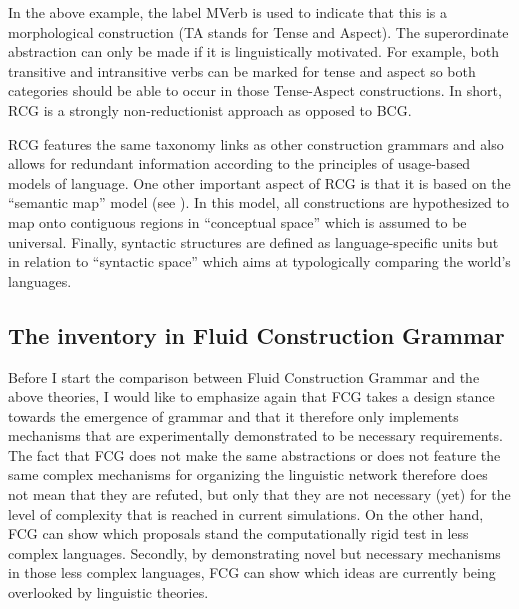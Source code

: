 \ea
{}
\z

In the above example, the label MVerb is used to indicate that this is a morphological construction (TA stands for Tense and Aspect). The superordinate abstraction can only be made if it is linguistically motivated. For example, both transitive and intransitive verbs can be marked for tense and aspect so both categories should be able to occur in those Tense-Aspect constructions. In short, RCG is a strongly non-reductionist approach as opposed to BCG.

RCG features the same taxonomy links as other construction grammars and also allows for redundant information according to the principles of usage-based models of language. One other important aspect of RCG is that it is based on the ``semantic map'' model (see ). In this model, all constructions are hypothesized to map onto contiguous regions in ``conceptual space'' which is assumed to be universal. Finally, syntactic structures are defined as language-specific units but in relation to ``syntactic space'' which aims at typologically comparing the world's languages.

\subsection{The inventory in Fluid Construction Grammar}

Before I start the comparison between Fluid Construction Grammar and the above theories, I would like to emphasize again that FCG takes a design stance towards the emergence of grammar and that it therefore only implements mechanisms that are experimentally demonstrated to be necessary requirements. The fact that FCG does not make the same abstractions or does not feature the same complex mechanisms for organizing the linguistic network therefore does not mean that they are refuted, but only that they are not necessary (yet) for the level of complexity that is reached in current simulations. On the other hand, FCG can show which proposals stand the computationally rigid test in less complex languages. Secondly, by demonstrating novel but necessary mechanisms in those less complex languages, FCG can show which ideas are currently being overlooked by linguistic theories.


